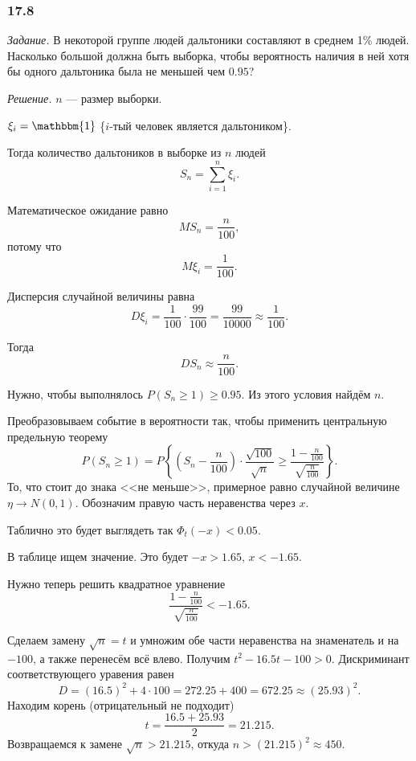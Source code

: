 \subsubsection*{17.8}

\textit{Задание.} В некоторой группе людей дальтоники составляют в среднем 1\% людей.
Насколько большой должна быть выборка,
чтобы вероятность наличия в ней хотя бы одного дальтоника была не меньшей чем $0.95$?

\textit{Решение.} $n$ --- размер выборки.

$ \xi_i = \mathbbm{1}$ \{$i$-тый человек является дальтоником\}.

Тогда количество дальтоников в выборке из $n$ людей
$$S_n =
  \sum \limits_{i = 1}^n \xi_i.$$

Математическое ожидание равно
$$MS_n =
  \frac{n}{100},$$
потому что
$$M \xi_i =
  \frac{1}{100}.$$

Дисперсия случайной величины равна
$$D \xi_i =
  \frac{1}{100} \cdot \frac{99}{100} =
  \frac{99}{10000} \approx
  \frac{1}{100}.$$

Тогда
$$DS_n \approx
  \frac{n}{100}.$$

Нужно, чтобы выполнялось $P \left( S_n \geq 1 \right) \geq 0.95$.
Из этого условия найдём $n$.

Преобразовываем событие в вероятности так, чтобы применить центральную предельную теорему
$$P \left( S_n \geq 1 \right) =
  P \left\{
    \left( S_n - \frac{n}{100} \right) \cdot \frac{ \sqrt{100}}{\sqrt{n}} \geq
    \frac{1 - \frac{n}{100}}{ \sqrt{ \frac{n}{100}}}
  \right\}.$$
То, что стоит до знака <<не меньше>>, примерное равно случайной величине
$ \eta \to N \left( 0, 1 \right) $.
Обозначим правую часть неравенства через $x$.

Таблично это будет выглядеть так $ \Phi_t \left( -x \right) < 0.05$.

В таблице ищем значение.
Это будет $-x > 1.65, \, x < -1.65$.

Нужно теперь решить квадратное уравнение
$$ \frac{1 - \frac{n}{100}}{ \sqrt{ \frac{n}{100}}} < -1.65.$$

Сделаем замену $ \sqrt{n} = t$ и умножим обе части неравенства на знаменатель и на $-100$,
а также перенесём всё влево.
Получим $t^2 - 16.5t - 100 > 0$.
Дискриминант соответствующего уравения равен
$$D =
  \left( 16.5 \right)^2 + 4 \cdot 100 =
  272.25 + 400 =
  672.25 \approx
  \left( 25.93 \right)^2.$$
Находим корень (отрицательный не подходит)
$$t =
  \frac{16.5 + 25.93}{2} =
  21.215.$$
Возвращаемся к замене $ \sqrt{n} > 21.215$, откуда $n >  \left( 21.215 \right)^2 \approx 450$.

